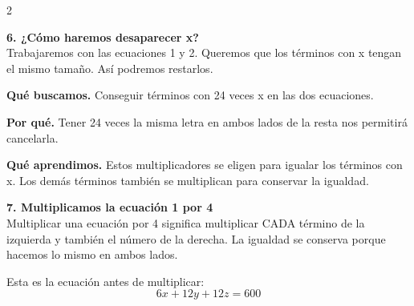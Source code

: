 \documentclass[11pt,a4paper,landscape]{article}
\begin{document}
\begin{multicols*}{2}
\noindent\begin{minipage}{\linewidth}\textbf{6. ¿Cómo haremos desaparecer x?}\\[2pt]Trabajaremos con las ecuaciones 1 y 2. Queremos que los términos con x tengan el mismo tamaño. Así podremos restarlos.
\par\smallskip\textbf{Qué buscamos.} Conseguir términos con 24 veces x en las dos ecuaciones.
\par\smallskip\textbf{Por qué.} Tener 24 veces la misma letra en ambos lados de la resta nos permitirá cancelarla.
\par{}\par\smallskip
\par\smallskip\textbf{Qué aprendimos.} Estos multiplicadores se eligen para igualar los términos con x. Los demás términos también se multiplican para conservar la igualdad.
\end{minipage}\par\medskip
\noindent\begin{minipage}{\linewidth}\textbf{7. Multiplicamos la ecuación 1 por 4}\\[2pt]Multiplicar una ecuación por 4 significa multiplicar CADA término de la izquierda y también el número de la derecha. La igualdad se conserva porque hacemos lo mismo en ambos lados.
\par\smallskip Esta es la ecuación antes de multiplicar:
\[6x + 12y + 12z = 600\]
\par{}\par\smallskip

\end{minipage}
\end{multicols*}
\end{document}
